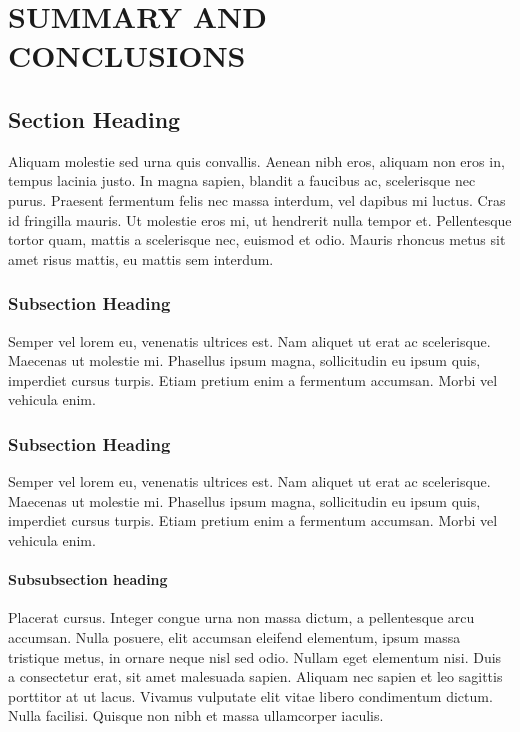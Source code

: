 \documentclass[../main.tex]{subfiles}
\begin{document}
\chapter{SUMMARY AND CONCLUSIONS} \label{conclusion}

\section{Section Heading}

Aliquam molestie sed urna quis convallis. Aenean nibh eros, aliquam non eros in, tempus lacinia justo. In magna sapien, blandit a faucibus ac, scelerisque nec purus. Praesent fermentum felis nec massa interdum, vel dapibus mi luctus. Cras id fringilla mauris. Ut molestie eros mi, ut hendrerit nulla tempor et. Pellentesque tortor quam, mattis a scelerisque nec, euismod et odio. Mauris rhoncus metus sit amet risus mattis, eu mattis sem interdum.

\subsection{Subsection Heading}
Semper vel lorem eu, venenatis ultrices est. Nam aliquet ut erat ac scelerisque. Maecenas ut molestie mi. Phasellus ipsum magna, sollicitudin eu ipsum quis, imperdiet cursus turpis. Etiam pretium enim a fermentum accumsan. Morbi vel vehicula enim.

\subsection{Subsection Heading}
Semper vel lorem eu, venenatis ultrices est. Nam aliquet ut erat ac scelerisque. Maecenas ut molestie mi. Phasellus ipsum magna, sollicitudin eu ipsum quis, imperdiet cursus turpis. Etiam pretium enim a fermentum accumsan. Morbi vel vehicula enim.

\subsubsection{Subsubsection heading}
 Placerat cursus. Integer congue urna non massa dictum, a pellentesque arcu accumsan. Nulla posuere, elit accumsan eleifend elementum, ipsum massa tristique metus, in ornare neque nisl sed odio. Nullam eget elementum nisi. Duis a consectetur erat, sit amet malesuada sapien. Aliquam nec sapien et leo sagittis porttitor at ut lacus. Vivamus vulputate elit vitae libero condimentum dictum. Nulla facilisi. Quisque non nibh et massa ullamcorper iaculis.\cite{BigRudin}
 
\end{document}
